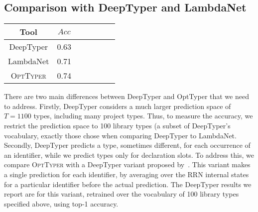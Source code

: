 \documentclass[acmsmall, review, anonymous]{acmart}\settopmatter{printfolios=true,printccs=false,printacmref=false}
\newcommand{\projectname}{\textsc{OptTyper}\xspace}
\begin{document}
\subsection{Comparison with DeepTyper and  LambdaNet}\label{ssec:typesubproblem}

\begin{table*}[t]
	\centering
	\caption{Accuracy for DeepTyper, LambdaNet and OptTyper; on $600$ annotations slots.}
		\label{tab:typeacc2}
	\begin{tabular}{ccccccc}
		\toprule
		Tool   &                              $Acc$ \\
		\midrule
		DeepTyper  & 0.63 \\
		LambdaNet  & 0.71 \\
		\projectname & 0.74\\
		\bottomrule
	\end{tabular}
\end{table*}

There are two main differences between DeepTyper 
and OptTyper that we need to address. Firstly, DeepTyper considers a much larger prediction space of $T=1100$ types, including many project types. Thus, to measure the accuracy, we restrict the prediction space to 100 library types (a subset of DeepTyper's vocabulary, exactly those \citet{wei20} chose when comparing DeepTyper to LambdaNet.
Secondly, DeepTyper predicts a type, sometimes different, for each occurrence of an identifier, while we predict types only for declaration slots. To address this, we compare \projectname{} with a DeepTyper variant proposed by~\citet{wei20}.
This variant makes a single prediction for each identifier, by averaging over the RRN internal states for a particular identifier before the actual prediction.
The DeepTyper results we report are for this variant, retrained over the vocabulary of 100 library types specified above, using top-1 accuracy.
\end{document}
